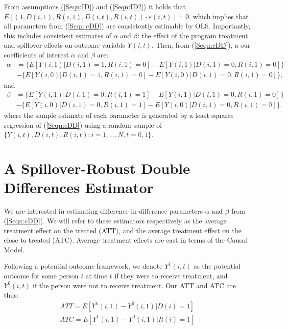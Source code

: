 \documentclass{article}
\begin{document}
\begin{spacing}{1.1}
From assumptions (\ref{Seqn:ID}) and (\ref{Seqn:ID2}) it holds that $E[(1,D(i,1),R(i,1),
D(i,t),R(i,t))\cdot\varepsilon(i,t)]=0$, which implies that all parameters from
(\ref{Seqn:cDD}) are consistently estimable by OLS.  Importantly, this includes
consistent estimates of $\alpha$ and $\beta$: the effect of the program treatment 
and spillover effects on outcome variable $Y(i,t)$.  Then, from (\ref{Seqn:cDD}),
a our coefficients of interest $\alpha$ and $\beta$ are:
\begin{equation}
\label{Seqn:DDa}
\begin{split}
\alpha&=\{E[Y(i,1)|D(i,1)=1,R(i,1)=0]-E[Y(i,1)|D(i,1)=0,R(i,1)=0]\} \\
      &-\{E[Y(i,0)|D(i,1)=1,R(i,1)=0]-E[Y(i,0)|D(i,1)=0,R(i,1)=0]\}, 
\end{split}
\end{equation}
and 
\begin{equation}
\label{Seqn:DDb}
\begin{split}
\beta&=\{E[Y(i,1)|D(i,1)=0,R(i,1)=1]-E[Y(i,1)|D(i,1)=0,R(i,1)=0]\} \\
      &-\{E[Y(i,0)|D(i,1)=0,R(i,1)=1]-E[Y(i,0)|D(i,1)=0,R(i,1)=0]\}. 
\end{split}
\end{equation}
where the sample estimate of each parameter is generated by a least squares
regression of (\ref{Seqn:cDD}) using a random sample of 
$\{Y(i,t), D(i,t), R(i,t): i=1, \ldots, N, t=0, 1\}$.

\section{A Spillover-Robust Double Differences Estimator}
We are interested in estimating difference-in-difference parameters $\alpha$ and 
$\beta$ from (\ref{Seqn:cDD}).  We will refer to these estimators respectively
as the average treatment effect on the treated (ATT), and the average treatment
effect on the close to treated (ATC).  Average treatment effects are cast in 
terms of the \citet{Rubin1974} Causal Model.

Following a potential outcome framework, we denote $Y^1(i,t)$ as the potential
outcome for some person $i$ at time $t$ if they were to receive treatment, and
$Y^0(i,t)$ if the person were not to receive treatment.  Our ATT and ATC are
thus:
\begin{eqnarray}
\label{Seqn:estim}
ATT=E[Y^1(i,1)-Y^0(i,1)|D(i)=1] \\
ATC=E[Y^1(i,1)-Y^0(i,1)|R(i)=1] 
\end{eqnarray}



\end{spacing}
\end{document}
